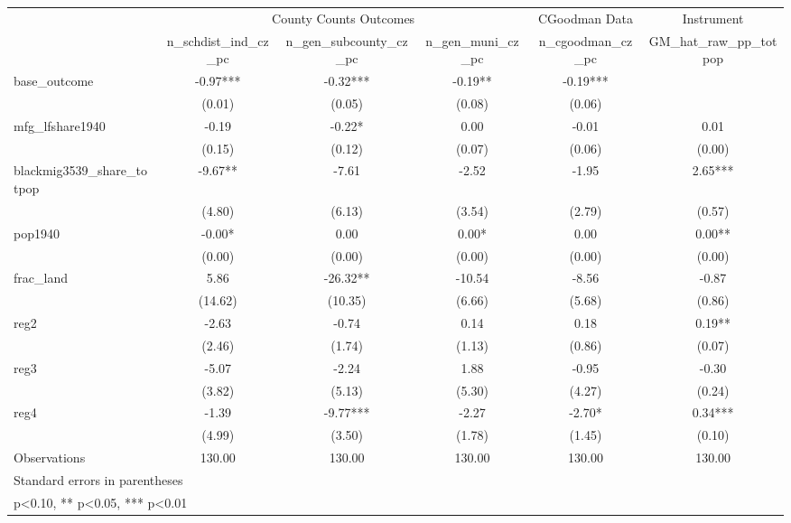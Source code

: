 {
\def\sym#1{\ifmmode^{#1}\else\(^{#1}\)\fi}
\begin{tabular}{l*{5}{c}}
\toprule
                &\multicolumn{3}{c}{County Counts Outcomes}  &\multicolumn{1}{c}{CGoodman Data}&\multicolumn{1}{c}{Instrument}\\\cmidrule(lr){2-4}\cmidrule(lr){5-5}\cmidrule(lr){6-6}
                &\multicolumn{1}{c}{n\_schdist\_ind\_cz\_pc}&\multicolumn{1}{c}{n\_gen\_subcounty\_cz\_pc}&\multicolumn{1}{c}{n\_gen\_muni\_cz\_pc}&\multicolumn{1}{c}{n\_cgoodman\_cz\_pc}&\multicolumn{1}{c}{GM\_hat\_raw\_pp\_totpop}\\
\midrule
base\_outcome    &      -0.97***&      -0.32***&      -0.19** &      -0.19***&              \\
                &     (0.01)   &     (0.05)   &     (0.08)   &     (0.06)   &              \\
\addlinespace
mfg\_lfshare1940 &      -0.19   &      -0.22*  &       0.00   &      -0.01   &       0.01   \\
                &     (0.15)   &     (0.12)   &     (0.07)   &     (0.06)   &     (0.00)   \\
\addlinespace
blackmig3539\_share\_totpop&      -9.67** &      -7.61   &      -2.52   &      -1.95   &       2.65***\\
                &     (4.80)   &     (6.13)   &     (3.54)   &     (2.79)   &     (0.57)   \\
\addlinespace
pop1940         &      -0.00*  &       0.00   &       0.00*  &       0.00   &       0.00** \\
                &     (0.00)   &     (0.00)   &     (0.00)   &     (0.00)   &     (0.00)   \\
\addlinespace
frac\_land       &       5.86   &     -26.32** &     -10.54   &      -8.56   &      -0.87   \\
                &    (14.62)   &    (10.35)   &     (6.66)   &     (5.68)   &     (0.86)   \\
\addlinespace
reg2            &      -2.63   &      -0.74   &       0.14   &       0.18   &       0.19** \\
                &     (2.46)   &     (1.74)   &     (1.13)   &     (0.86)   &     (0.07)   \\
\addlinespace
reg3            &      -5.07   &      -2.24   &       1.88   &      -0.95   &      -0.30   \\
                &     (3.82)   &     (5.13)   &     (5.30)   &     (4.27)   &     (0.24)   \\
\addlinespace
reg4            &      -1.39   &      -9.77***&      -2.27   &      -2.70*  &       0.34***\\
                &     (4.99)   &     (3.50)   &     (1.78)   &     (1.45)   &     (0.10)   \\
\midrule
Observations    &     130.00   &     130.00   &     130.00   &     130.00   &     130.00   \\
\bottomrule
\multicolumn{6}{l}{\footnotesize Standard errors in parentheses}\\
\multicolumn{6}{l}{\footnotesize * p<0.10, ** p<0.05, *** p<0.01}\\
\end{tabular}
}
